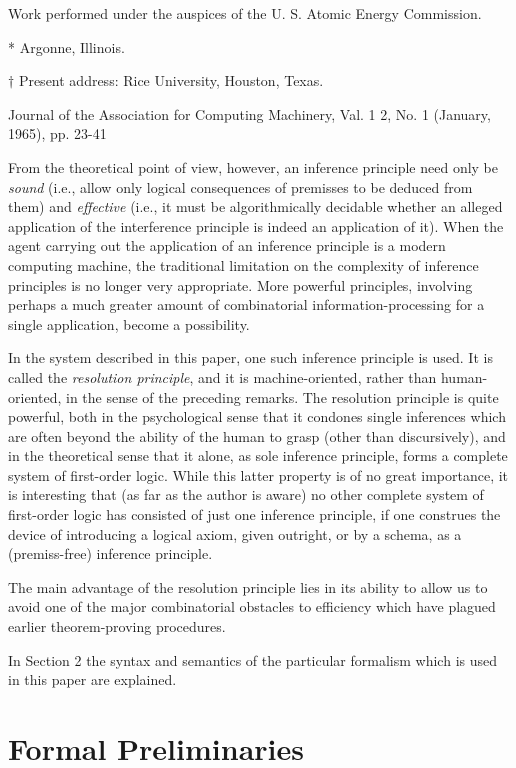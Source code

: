 \documentclass[8pt]{extarticle}
\begin{document}
Work performed under the auspices of the U. S. Atomic Energy Commission.

* Argonne, Illinois.

$\dagger$ Present address: Rice University, Houston, Texas.

\vspace{0.2in}
Journal of the Association for Computing Machinery, Val. 1 2, No. 1 (January, 1965), pp. 23-41

\newpage

From the theoretical point of view, however, an inference principle need only be \emph{sound} (i.e., allow only logical consequences of premisses to be deduced from them) and \emph{effective} (i.e., it must be algorithmically decidable whether an alleged application of the interference principle is indeed an application of it). When the agent carrying out the application of an inference principle is a modern computing machine, the traditional limitation on the complexity of inference principles is no longer very appropriate. More powerful principles, involving perhaps a much greater amount of combinatorial information-processing for a single application, become a possibility.

In the system described in this paper, one such inference principle is used. It is called the \emph{resolution principle}, and it is machine-oriented, rather than human-oriented, in the sense of the preceding remarks. The resolution principle is quite powerful, both in the psychological sense that it condones single inferences which are often beyond the ability of the human to grasp (other than discursively), and in the theoretical sense that it alone, as sole inference principle, forms a complete system of first-order logic. While this latter property is of no great importance, it is interesting that (as far as the author is aware) no other complete system of first-order logic has consisted of just one inference principle, if one construes the device of introducing a logical axiom, given outright, or by a schema, as a (premiss-free) inference principle.

The main advantage of the resolution principle lies in its ability to allow us to avoid one of the major combinatorial obstacles to efficiency which have plagued earlier theorem-proving procedures.

In Section 2 the syntax and semantics of the particular formalism which is used in this paper are explained.

\section{Formal Preliminaries}
\end{document}
